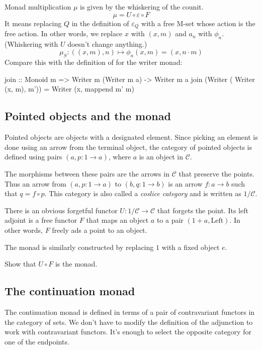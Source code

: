 \documentclass[DaoFP]{subfiles}
\begin{document}
Monad multiplication $\mu$ is given by the whiskering of the counit.
\[ \mu = U \circ \varepsilon \circ F \]
It means replacing $Q$ in the definition of $\varepsilon_Q$ with a free M-set whose action is the free action. In other words, we replace $x$ with $(x, m)$ and $a_n$ with $\phi_n$. (Whiskering with $U$ doesn't change anything.)
\[ \mu_S \colon ((x, m), n) \mapsto \phi_n (x, m) = (x, n \cdot m) \]
Compare this with the definition of  for the writer monad:
\begin{haskell}
join :: Monoid m => Writer m (Writer m a) -> Writer m a
join (Writer ( Writer (x, m), m')) = Writer (x, mappend m' m)
\end{haskell}

\subsection{Pointed objects and the  monad}

Pointed objects are objects with a designated element. Since picking an element is done using an arrow from the terminal object, the category of pointed objects is defined using pairs $(a, p \colon 1 \to a)$, where $a$ is an object in $\mathcal{C}$. 

The morphisms between these pairs are the arrows in $\mathcal{C}$ that preserve the points. Thus an arrow from $(a, p \colon 1 \to a)$ to $(b, q \colon 1 \to b)$ is an arrow $f \colon a \to b$ such that $q = f \circ p$. This category is also called a \emph{coslice category} and is written as $1/\mathcal{C}$.

There is an obvious forgetful functor $U \colon 1/\mathcal{C} \to \mathcal{C}$ that forgets the point. Its left adjoint is a free functor $F$ that maps an object $a$ to a pair $(1 + a, \text{Left})$. In other words, $F$ freely ads a point to an object. 

The  monad is similarly constructed by replacing $1$ with a fixed object $e$.

\begin{exercise}
Show that $U \circ F$ is the  monad.
\end{exercise}

\subsection{The continuation monad}

The continuation monad is defined in terms of a pair of contravariant functors in the category of sets. We don't have to modify the definition of the adjunction to work with contravariant functors. It's enough to select the opposite category for one of the endpoints. 
\end{document}
